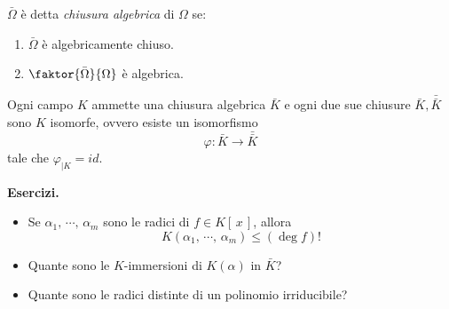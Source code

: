 \begin{multicols}{2}
\begin{definition}
	$ \bar{\Omega} $ è detta \emph{chiusura algebrica} di $ \Omega $ se:
	\begin{enumerate}
		\item $ \bar{\Omega} $ è algebricamente chiuso.
		\item $ \faktor{\bar{\Omega}}{\Omega} $ è algebrica.
	\end{enumerate}
\end{definition}

\begin{theorem}
	Ogni campo $ K $ ammette una chiusura algebrica $ \bar{K} $ e ogni due sue chiusure $ \bar{K}, \bar{\bar{K}} $ sono $ K $ isomorfe, ovvero esiste un isomorfismo
	\[ \varphi : \bar{K} \to \bar{\bar{K}} \]
	tale che $ \varphi_{|K} = id $.
\end{theorem}

\textbf{Esercizi.}
\begin{itemize}
	\item Se $ \alpha_1,\, \cdots,\, \alpha_m $ sono le radici di $ f \in K[\,x\,] $, allora
	 \[ K(\alpha_1,\, \cdots,\, \alpha_m) \leq (\deg f)! \]
	 
	 \item Quante sono le $ K $-immersioni di $ K(\alpha) $ in $ \bar{K} $?
	 
	 \item Quante sono le radici distinte di un polinomio irriducibile?
\end{itemize}


\end{multicols}
